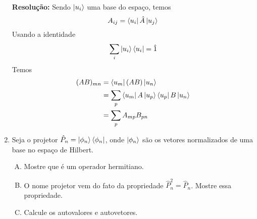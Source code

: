 \documentclass[a4paper, 12pt, notitlepage]{article}
\begin{document}
\begin{enumerate}
\textbf{Resolução: }
Sendo $\ket{u_i}$ uma base do espaço, temos
\[ A_{ij} = \bra{u_i} \hat{A} \ket{u_j} \]
Usando a identidade
\[ \sum_i \ket{u_i}\bra{u_i} = \hat{1} \]
Temos
\begin{align*}
(AB)_{mn} &= \bra{u_m} (AB) \ket{u_n} \\
&= \sum_p \bra{u_m} A \ket{u_p} \bra{u_p} B \ket{u_n} \\
&= \sum_p A_{mp}B_{pn}
\end{align*}

\item Seja o projetor $\hat{P}_n = \ket{\phi_n}\bra{\phi_n}$, onde $\ket{\phi_n}$ são os vetores normalizados de uma base no espaço de Hilbert.
  \begin{enumerate}[(A)]
    \item Mostre que é um operador hermitiano.
    \item O nome projetor vem do fato da propriedade $\hat{P}_n^2 = \hat{P}_n$. Mostre essa propriedade.
    \item Calcule os autovalores e autovetores.
  \end{enumerate}


\end{enumerate}
\end{document}
